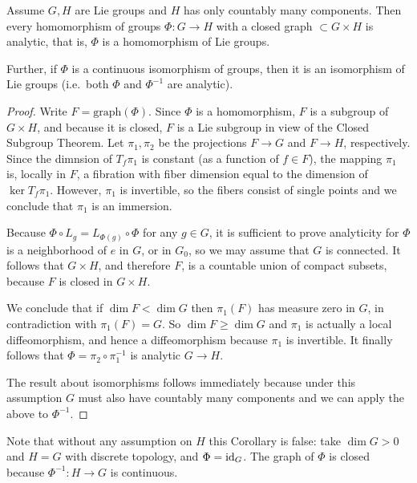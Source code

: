 \begin{cor}[{{\cite[Prop.~1.10.8]{DK}}}]
    Assume $G,H$ are Lie groups and $H$ has only countably many components. Then every homomorphism of groups $\Phi:G\to H$ with a closed graph $\subset G\times H$ is analytic, that is, $\Phi$ is a homomorphism of Lie groups.

    Further, if $\Phi$ is a continuous isomorphism of groups, then it is an isomorphism of Lie groups (i.e.~both $\Phi$ and $\Phi^{-1}$ are analytic).
\end{cor}
\begin{proof}
    Write $F=\mathrm{graph}(\Phi)$. Since $\Phi$ is a homomorphism, $F$ is a subgroup of $G\times H$, and because it is closed, $F$ is a Lie subgroup in view of the Closed Subgroup Theorem. Let $\pi_1,\pi_2$ be the projections $F\to G$ and $F\to H$, respectively. Since the dimnsion of $T_f\pi_1$ is constant (as a function of $f\in F$), the mapping $\pi_1$ is, locally in $F$, a fibration with fiber dimension equal to the dimension of $\ker T_f\pi_1$. However, $\pi_1$ is invertible, so the fibers consist of single points and we conclude that $\pi_1$ is an immersion.

    Because $\Phi\circ L_g=L_{\Phi(g)}\circ\Phi$ for any $g\in G$, it is sufficient to prove analyticity for $\Phi$ is a neighborhood of $e$ in $G$, or in $G_0$, so we may assume that $G$ is connected. It follows that $G\times H$, and therefore $F$, is a countable union of compact subsets, because $F$ is closed in $G\times H$.

    We conclude that if $\dim F<\dim G$ then $\pi_1(F)$ has measure zero in $G$, in contradiction with $\pi_1(F)=G$. So $\dim F\geq \dim G$ and $\pi_1$ is actually a local diffeomorphism, and hence a diffeomorphism because $\pi_1$ is invertible. It finally follows that $\Phi=\pi_2\circ\pi_1^{-1}$ is analytic $G\to H$.

    The result about isomorphisms follows immediately because under this assumption $G$ must also have countably many components and we can apply the above to $\Phi^{-1}$.
\end{proof}

\begin{rem}
    Note that without any assumption on $H $ this Corollary is false: take $\dim G>0$ and $H=G$ with discrete topology, and $\Phi=\operatorname{id}_G$. The graph of $\Phi$ is closed because $\Phi^{-1}:H\to G$ is continuous.
\end{rem}


